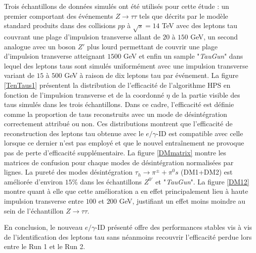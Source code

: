 Trois échantillons de données simulés ont été utilisés pour cette étude : un premier comportant des événements $Z\rightarrow\tau\tau$ tels que décrits par le modèle standard produits dans des collisions $pp$ à $\sqrt{s}=14$ TeV avec des leptons tau couvrant une plage d'impulsion transverse allant de $20$ à $150$ GeV, un second analogue avec un boson $Z'$ plus lourd permettant de couvrir une plage d'impulsion transverse atteignant $1500$ GeV et enfin un sample "\textit{TauGun}" dans lequel des leptons taus sont simulés uniformément avec une impulsion transverse variant de $15$ à $500$ GeV à raison de dix leptons tau par événement. La figure \ref{TenTaus1} présentent la distribution de l'efficacité de l'algorithme HPS en fonction de l'impulsion transverse et de la coordonné $\eta$ de la partie visible des taus simulés dans les trois échantillons. Dans ce cadre, l'efficacité est définie comme la proportion de taus reconstruits avec un mode de désintégration correctement attribué ou non. Ces distributions montrent que l'efficacité de reconstruction des leptons tau obtenue avec le $e/\gamma$-ID est compatible avec celle lorsque ce dernier n'est pas employé et que le nouvel entraînement ne provoque pas de perte d'efficacité supplémentaire. La figure \ref{DMmatrix} montre les matrices de confusion pour chaque modes de désintégration normalisées par lignes. La pureté des modes désintégration $\tau_h\rightarrow\pi^{\pm}+\pi^0s$ (DM1+DM2) est améliorée d'environ $15\%$ dans les échantillons $Z^{0'}$ et "\textit{TauGun}". La figure \ref{DM12} montre quant à elle que cette amélioration a en effet principalement lieu à haute impulsion transverse entre $100$ et $200$ GeV, justifiant un effet moins moindre au sein de l'échantillon $Z\rightarrow\tau\tau$. 





En conclusion, le nouveau $e/\gamma$-ID présenté offre des performances stables vis à vis de l'identification des leptons tau sans néanmoins recouvrir l'efficacité perdue lors entre le Run 1 et le Run 2.

